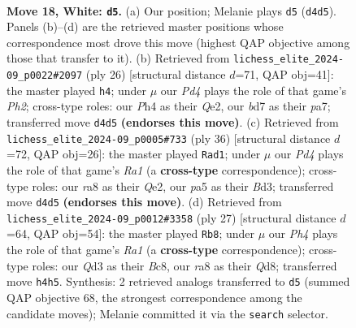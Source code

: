 \documentclass[11pt]{article}
\begin{document}
\begin{figure}[p]
\label{fig:thought-m32}
\end{figure}

\clearpage

\begin{figure}[p]\centering
\begin{subfigure}{0.46\textwidth}\centering
\resizebox{\linewidth}{!}{%
\newchessgame
\chessboard[
  setfen={rr1q2k1/p2b1ppp/2p1pn2/p7/2BPP2P/1P1Q1NP1/P4P2/R3R1K1 w - - 0 18},
  showmover=false,
  pgfstyle=straightmove, color=movearrow, markmove={d4-d5}
]}
\caption{}
\end{subfigure}\hfill
\begin{subfigure}{0.46\textwidth}\centering
\resizebox{\linewidth}{!}{%
\newchessgame
\chessboard[
  setfen={r4rk1/pp1qbppp/2n1p3/3pP3/3P4/5NP1/PP1BQP1P/R4RK1 w - - 1 14},
  showmover=false,
  pgfstyle=straightmove, color=movearrow, markmove={h2-h4}
]}
\caption{}
\end{subfigure}
\\[4pt]
\begin{subfigure}{0.46\textwidth}\centering
\resizebox{\linewidth}{!}{%
\newchessgame
\chessboard[
  setfen={1r2k2r/p3nppp/1qb1p3/2ppP3/2P4P/1P1B1NP1/P3QP2/R4RK1 w k - 1 19},
  showmover=false,
  pgfstyle=straightmove, color=movearrow, markmove={a1-d1}
]}
\caption{}
\end{subfigure}\hfill
\begin{subfigure}{0.46\textwidth}\centering
\resizebox{\linewidth}{!}{%
\newchessgame
\chessboard[
  setfen={r1bq1rk1/p1b3pp/p3pn2/2Np1p2/3P4/1P2P3/4NPPP/R1BQ1RK1 b - - 3 14},
  showmover=false,
  pgfstyle=straightmove, color=movearrow, markmove={a8-b8}
]}
\caption{}
\end{subfigure}
\caption{\textbf{Move 18, White: \texttt{d5}.} (a) Our position; Melanie plays \texttt{d5} (\texttt{d4d5}). Panels (b)--(d) are the retrieved master positions whose correspondence most drove this move (highest QAP objective among those that transfer to it). (b) Retrieved from \texttt{lichess\_elite\_2024-09\_p0022\#2097} (ply 26) [structural distance $d$=71, QAP obj=41]: the master played \texttt{h4}; under $\mu$ our \emph{Pd4} plays the role of that game's \emph{Ph2}; cross-type roles: our \emph{P}h4 as their \emph{Q}e2, our \emph{b}d7 as their \emph{p}a7; transferred move \texttt{d4d5} \textbf{(endorses this move)}. (c) Retrieved from \texttt{lichess\_elite\_2024-09\_p0005\#733} (ply 36) [structural distance $d$=72, QAP obj=26]: the master played \texttt{Rad1}; under $\mu$ our \emph{Pd4} plays the role of that game's \emph{Ra1} (a \textbf{cross-type} correspondence); cross-type roles: our \emph{r}a8 as their \emph{Q}e2, our \emph{p}a5 as their \emph{B}d3; transferred move \texttt{d4d5} \textbf{(endorses this move)}. (d) Retrieved from \texttt{lichess\_elite\_2024-09\_p0012\#3358} (ply 27) [structural distance $d$=64, QAP obj=54]: the master played \texttt{Rb8}; under $\mu$ our \emph{Ph4} plays the role of that game's \emph{Ra1} (a \textbf{cross-type} correspondence); cross-type roles: our \emph{Q}d3 as their \emph{B}c8, our \emph{r}a8 as their \emph{Q}d8; transferred move \texttt{h4h5}. Synthesis: 2 retrieved analogs transferred to \texttt{d5} (summed QAP objective 68, the strongest correspondence among the candidate moves); Melanie committed it via the \texttt{search} selector.}

\end{figure}
\end{document}
